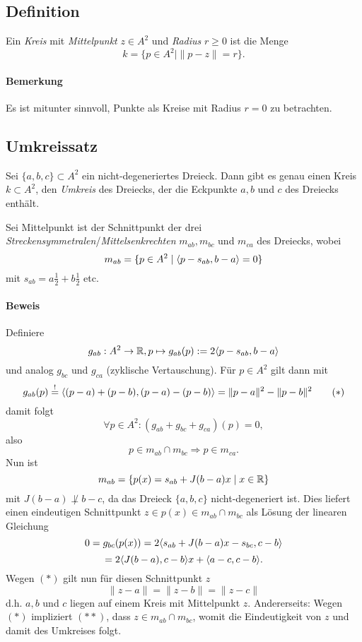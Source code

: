 \subsection{Definition}
	Ein \emph{Kreis} mit \emph{Mittelpunkt} $ z\in A^2 $ und \emph{Radius} $ r\geq 0 $ ist die Menge
		\[ k = \{p\in A^2\mid \|p-z\| = r\}. \]
\paragraph{Bemerkung}
	Es ist mitunter sinnvoll, Punkte als Kreise mit Radius $ r=0 $ zu betrachten.
	
\subsection{Umkreissatz}
	Sei $ \{a,b,c\} \subset A^2 $ ein nicht-degeneriertes Dreieck. Dann gibt es genau einen Kreis $ k\subset A^2 $, den \emph{Umkreis} des Dreiecks, der die Eckpunkte $ a,b $ und $ c $ des Dreiecks enthält.
	
	Sei Mittelpunkt ist der Schnittpunkt der drei \emph{Streckensymmetralen}/\emph{Mittelsenkrechten} $ m_{ab}, m_{bc}$ und $ m_{ca} $ des Dreiecks, wobei
		\[ m_{ab} = \{p\in A^2\mid \langle p-s_{ab},b-a \rangle = 0\} \]
	mit $ s_{ab} = a\frac{1}{2}+b\frac{1}{2} $ etc.
\paragraph{Beweis}
	Definiere
		\[ g_{ab} : A^2\to \mathbb{R}, p\mapsto g_{ab}(p):= 2\langle p-s_{ab},b-a \rangle \]
	und analog $ g_{bc} $ und $ g_{ca} $ (zyklische Vertauschung).
	Für $ p\in A^2 $ gilt dann mit
		\[ g_{ab}(p) \overset{!}{=} \langle (p-a)+(p-b),(p-a)-(p-b) \rangle  = \|p-a\|^2-\|p-b\|^2 \tag{$ * $} \]
	damit folgt
		\[ \forall p\in A^2: (g_{ab}+g_{bc}+g_{ca})(p) = 0, \]
	also
		\[ p\in m_{ab}\cap m_{bc} \Rightarrow p\in m_{ca}. \]
	Nun ist
		\[ m_{ab} = \{p(x) = s_{ab}+J(b-a)x\mid x\in \mathbb{R}\} \]
	mit $ J(b-a)\not\perp b-c $, da das Dreieck $ \{a,b,c\} $ nicht-degeneriert ist. Dies liefert einen eindeutigen Schnittpunkt $ z\in p(x)\in m_{ab}\cap m_{bc} $ als Lösung der linearen Gleichung
		\[ 0 = g_{bc}(p(x)) = 2\langle s_{ab}+J(b-a)x-s_{bc},c-b \rangle \]
		\[ = 2\langle J(b-a),c-b \rangle x+\langle a-c,c-b \rangle. \]
	Wegen $ (*) $ gilt nun für diesen Schnittpunkt $ z $
		\[ \|z-a\| = \|z-b\| = \|z-c\| \tag{$ ** $} \]
	d.h. $ a,b $ und $ c $ liegen auf einem Kreis mit Mittelpunkt $ z $.
	Andererseits: Wegen $ (*) $ impliziert $ (**) $, dass $ z\in m_{ab}\cap m_{bc} $, womit die Eindeutigkeit von $ z $ und damit des Umkreises folgt.

